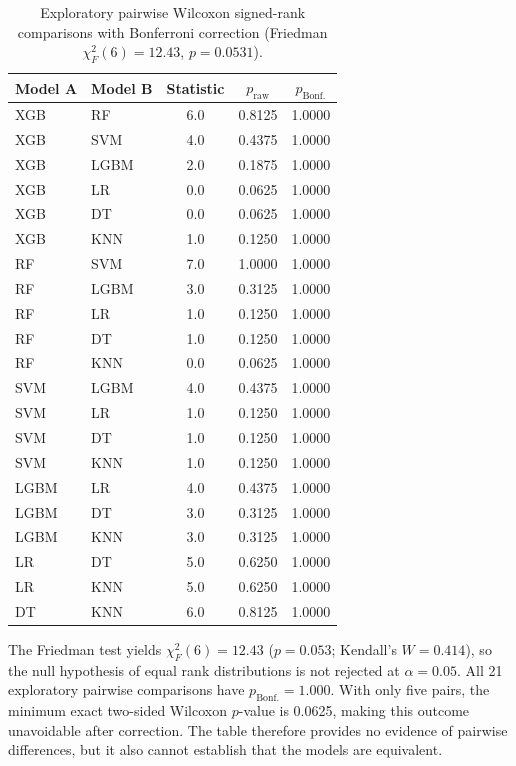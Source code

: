 \clearpage
\begin{table}[htbp]
  \centering
  \caption[Exploratory pairwise Wilcoxon comparisons]{Exploratory pairwise Wilcoxon signed-rank comparisons with Bonferroni correction (Friedman $\chi^2_F(6) = 12.43$, $p = 0.0531$).}
  \label{tab:app_pairwise}
  \small
  \begin{tabular}{llccc}
    \toprule
    Model A & Model B & Statistic & $p_\text{raw}$ & $p_\text{Bonf.}$ \\
    \midrule
    XGB  & RF   & 6.0 & 0.8125 & 1.0000 \\
    XGB  & SVM  & 4.0 & 0.4375 & 1.0000 \\
    XGB  & LGBM & 2.0 & 0.1875 & 1.0000 \\
    XGB  & LR   & 0.0 & 0.0625 & 1.0000 \\
    XGB  & DT   & 0.0 & 0.0625 & 1.0000 \\
    XGB  & KNN  & 1.0 & 0.1250 & 1.0000 \\
    RF   & SVM  & 7.0 & 1.0000 & 1.0000 \\
    RF   & LGBM & 3.0 & 0.3125 & 1.0000 \\
    RF   & LR   & 1.0 & 0.1250 & 1.0000 \\
    RF   & DT   & 1.0 & 0.1250 & 1.0000 \\
    RF   & KNN  & 0.0 & 0.0625 & 1.0000 \\
    SVM  & LGBM & 4.0 & 0.4375 & 1.0000 \\
    SVM  & LR   & 1.0 & 0.1250 & 1.0000 \\
    SVM  & DT   & 1.0 & 0.1250 & 1.0000 \\
    SVM  & KNN  & 1.0 & 0.1250 & 1.0000 \\
    LGBM & LR   & 4.0 & 0.4375 & 1.0000 \\
    LGBM & DT   & 3.0 & 0.3125 & 1.0000 \\
    LGBM & KNN  & 3.0 & 0.3125 & 1.0000 \\
    LR   & DT   & 5.0 & 0.6250 & 1.0000 \\
    LR   & KNN  & 5.0 & 0.6250 & 1.0000 \\
    DT   & KNN  & 6.0 & 0.8125 & 1.0000 \\
    \bottomrule
  \end{tabular}
\end{table}

The Friedman test yields $\chi^2_F(6)=12.43$ ($p=0.053$; Kendall's $W=0.414$), so the null hypothesis of equal rank distributions is not rejected at $\alpha=0.05$. All 21 exploratory pairwise comparisons have $p_\text{Bonf.}=1.000$. With only five pairs, the minimum exact two-sided Wilcoxon $p$-value is 0.0625, making this outcome unavoidable after correction. The table therefore provides no evidence of pairwise differences, but it also cannot establish that the models are equivalent.


